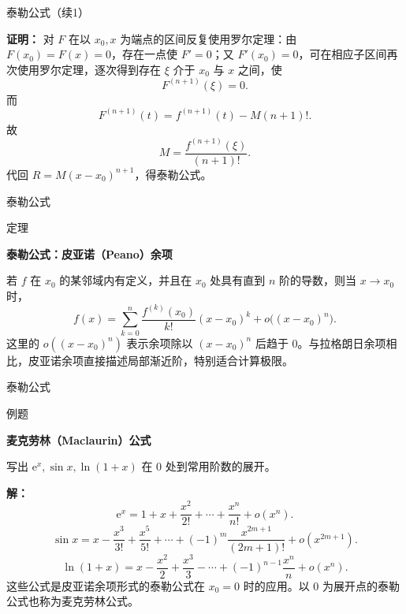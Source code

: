 \documentclass[aspectratio=169,10pt,fontset=fandol]{ctexbeamer}
\newcommand{\ee}{\mathrm{e}}
\begin{document}
\begin{frame}[t,fragile]{泰勒公式（续1）}
\footnotesize
{\footnotesize
\textbf{证明：}
 对 $F$ 在以 $x_0,x$ 为端点的区间反复使用罗尔定理：由 $F(x_0)=F(x)=0$，存在一点使 $F'=0$；又 $F'(x_0)=0$，可在相应子区间再次使用罗尔定理，逐次得到存在 $\xi$ 介于 $x_0$ 与 $x$ 之间，使
\[
F^{(n+1)}(\xi)=0.
\]
而
\[
F^{(n+1)}(t)=f^{(n+1)}(t)-M(n+1)!.
\]
故
\[
M=\frac{f^{(n+1)}(\xi)}{(n+1)!}.
\]
代回 $R=M(x-x_0)^{n+1}$，得泰勒公式。

}
\end{frame}
\begin{frame}[t,fragile]{泰勒公式}
\normalsize
\begin{block}{定理}
{\normalsize
\textbf{泰勒公式：皮亚诺（Peano）余项}\par

若 \(f\) 在 \(x_0\) 的某邻域内有定义，并且在 \(x_0\) 处具有直到 \(n\) 阶的导数，则当 \(x\to x_0\) 时，
\[
f(x)=\sum_{k=0}^{n}\frac{f^{(k)}(x_0)}{k!}(x-x_0)^k
+o\bigl((x-x_0)^n\bigr).
\]
这里的 \(o((x-x_0)^n)\) 表示余项除以 \((x-x_0)^n\) 后趋于 \(0\)。与拉格朗日余项相比，皮亚诺余项直接描述局部渐近阶，特别适合计算极限。

}
\end{block}
\end{frame}
\begin{frame}[t,fragile]{泰勒公式}
\normalsize
\begin{block}{例题}
{\normalsize
\textbf{麦克劳林（Maclaurin）公式}\par

写出 $\ee^x,\sin x,\ln(1+x)$ 在 $0$ 处到常用阶数的展开。

}
\end{block}
\pause
{\normalsize
\textbf{解：}
\[
\ee^x=1+x+\frac{x^2}{2!}+\cdots+\frac{x^n}{n!}+o(x^n).
\]
\[
\sin x=x-\frac{x^3}{3!}+\frac{x^5}{5!}+\cdots+(-1)^m\frac{x^{2m+1}}{(2m+1)!}+o(x^{2m+1}).
\]
\[
\ln(1+x)=x-\frac{x^2}{2}+\frac{x^3}{3}-\cdots+(-1)^{n-1}\frac{x^n}{n}+o(x^n).
\]
这些公式是皮亚诺余项形式的泰勒公式在 \(x_0=0\) 时的应用。以 \(0\) 为展开点的泰勒公式也称为麦克劳林公式。

}
\end{frame}
\end{document}
